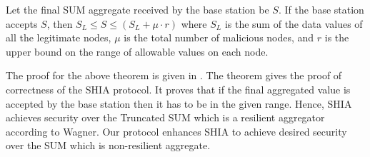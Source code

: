 	\begin{theorem}
		\cite{chan2006secure}
		Let the final SUM aggregate received by the base station be $S$.
		If the base station accepts $S$, then $S_{L} \leq S \leq (S_{L} + \mu \cdot r)$ where $S_{L}$ is the sum of the data values of all the legitimate nodes, $\mu$ is the total number of malicious nodes, and $r$ is the upper bound on the range of allowable values on each node.
	\end{theorem}
	The proof for the above theorem is given in \cite{chan2006secure}.
	The theorem gives the proof of correctness of the SHIA protocol.
	It proves that if the final aggregated value is accepted by the base station then it has to be in the given range. 
	Hence, SHIA achieves security over the Truncated SUM which is a resilient aggregator according to Wagner\cite{wagner2004resilient}.
	Our protocol enhances SHIA to achieve desired security over the SUM which is non-resilient aggregate.
